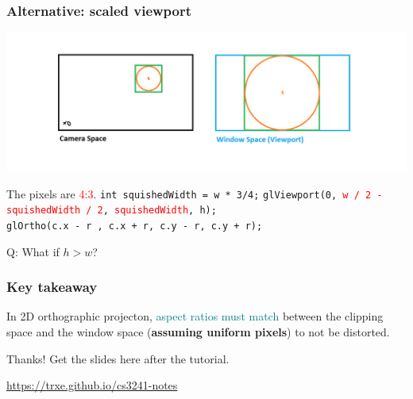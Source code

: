 \documentclass{beamer}
\begin{document}
\begin{frame}
    \frametitle{Alternative: scaled viewport}

    \begin{center}
        \includegraphics[scale=0.4]{q7-cam-win-4.png}
    \end{center}

    \begin{tcolorbox}
        The pixels are \textcolor{red}{4:3}.
        \texttt{int squishedWidth = w * 3/4;}
        \texttt{glViewport(0, \textcolor{red}{w / 2 - squishedWidth / 2}, \textcolor{red}{squishedWidth}, h);}\\
        \texttt{glOrtho(c.x - r , c.x + r, c.y - r, c.y + r);}
    \end{tcolorbox}

    Q: What if $h > w$?

\end{frame}

\begin{frame}
    \frametitle{Key takeaway}

    In 2D orthographic projecton, \textcolor{teal}{aspect ratios must match} between 
    the clipping space and the window space (\textbf{assuming uniform pixels})
    to not be distorted.

\end{frame}

\ThankYou
\begin{frame}
    Thanks! Get the slides here after the tutorial.\\
    \vspace{2em}
    \scalebox{3}{\faGithub}\par\bigskip
    \url{https://trxe.github.io/cs3241-notes}
\end{frame}
\end{document}
